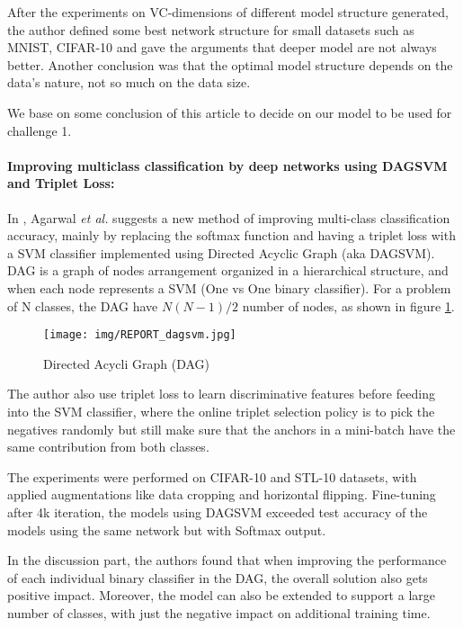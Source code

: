 \documentclass[10pt,twocolumn,letterpaper]{article}
\begin{document}
After the experiments on VC-dimensions \cite{wiki:vc-dimension} of different model structure generated, the author defined some best network structure for small datasets such as MNIST, CIFAR-10 and gave the arguments that deeper model are not always better. Another conclusion was that the optimal model structure depends on the data's nature, not so much on the data size.

We base on some conclusion of this article to decide on our model to be used for challenge 1.

\paragraph{Improving multiclass classification by deep networks using DAGSVM and Triplet Loss:}  In \cite{AGARWAL2018_DAGSVM}, Agarwal \textit{et al.} suggests a new method of improving multi-class classification accuracy, mainly by replacing the softmax function and having a triplet loss with a SVM classifier implemented using Directed Acyclic Graph (aka DAGSVM). DAG is a graph of nodes arrangement organized in a hierarchical structure, and when each node represents a SVM (One vs One binary classifier). For a problem of N classes, the DAG have \(N(N-1)/2\) number of nodes, as shown in figure \ref{figure:dagsvm}. 

 \begin{figure}[h!]
   \centering
       \texttt{[image: img/REPORT\_dagsvm.jpg]}
   \caption{Directed Acycli Graph (DAG)\label{figure:dagsvm}}
 \end{figure}

The author also use triplet loss to learn discriminative features before feeding into the SVM classifier, where the online triplet selection policy is to pick the negatives randomly but still make sure that the anchors in a mini-batch have the same contribution from both classes.

The experiments were performed on CIFAR-10 and STL-10 datasets, with applied augmentations like data cropping and horizontal flipping. 
Fine-tuning after 4k iteration, the models using DAGSVM exceeded test accuracy of the models using the same network but with Softmax output. 

In the discussion part, the authors found that when improving the performance of each individual binary classifier in the DAG, the overall solution also gets positive impact. Moreover, the model can also be extended to support a large number of classes, with just the negative impact on additional training time.
\end{document}
